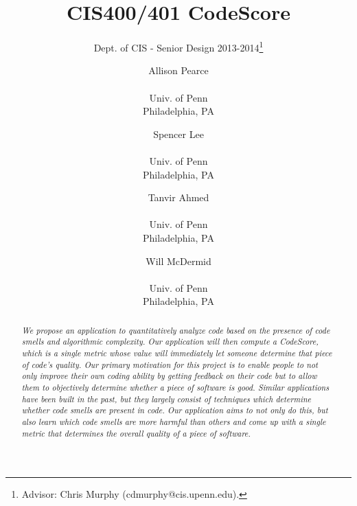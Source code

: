\documentclass{sig-alternate}
\begin{document}
 

\title{CIS400/401 CodeScore}
\subtitle{Dept. of CIS - Senior Design 2013-2014\thanks{Advisor: Chris Murphy (cdmurphy@cis.upenn.edu).}}

\author{
Allison Pearce \\  \\ Univ. of Penn \\ Philadelphia, PA
\and Spencer Lee \\  \\ Univ. of Penn \\ Philadelphia, PA
\and Tanvir Ahmed \\  \\ Univ. of Penn \\ Philadelphia, PA
\and Will McDermid \\  \\ Univ. of Penn \\ Philadelphia, PA}

\date{}
\maketitle

\begin{abstract}
  \textit{We propose an application to quantitatively analyze code based on the presence of code smells and algorithmic complexity. Our application will then compute a CodeScore, which is a single metric whose value will immediately let someone determine that piece of code's quality. Our primary motivation for this project is to enable people to not only improve their own coding ability by getting feedback on their code but to allow them to objectively determine whether a piece of software is good. Similar applications have been built in the past, but they largely consist of techniques which determine whether code smells are present in code. Our application aims to not only do this, but also learn which code smells are more harmful than others and come up with a single metric that determines the overall quality of a piece of software.}
\end{abstract}
\end{document}
